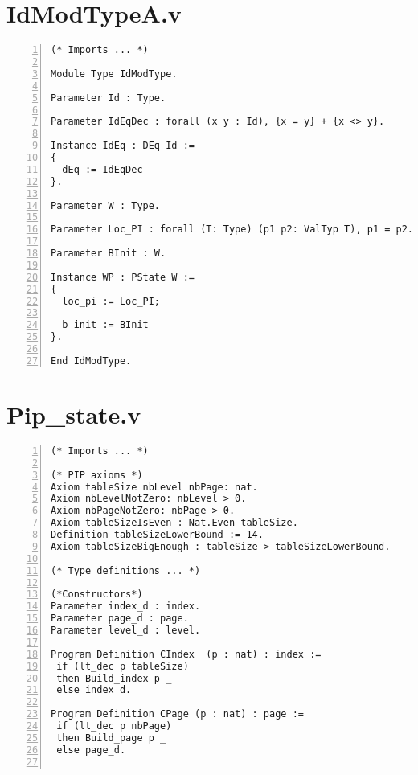 \begin{appendices}

\makeatletter
{}
\makeatother

\chapter{IdModTypeA.v} \label{ModType}
\begin{lstlisting}[xleftmargin=-.1\textwidth,
xrightmargin=-.1\textwidth,
mathescape=true,numbers=left]
(* Imports ... *)

Module Type IdModType.

Parameter Id : Type.

Parameter IdEqDec : forall (x y : Id), {x = y} + {x <> y}.

Instance IdEq : DEq Id :=
{
  dEq := IdEqDec
}.

Parameter W : Type.

Parameter Loc_PI : forall (T: Type) (p1 p2: ValTyp T), p1 = p2.

Parameter BInit : W.

Instance WP : PState W :=
{
  loc_pi := Loc_PI;
  
  b_init := BInit
}.              
  
End IdModType.
\end{lstlisting}

\chapter{Pip\_state.v} \label{stateFile}
\begin{lstlisting}[xleftmargin=-.1\textwidth,
xrightmargin=-.1\textwidth,
mathescape=true,numbers=left]
(* Imports ... *)

(* PIP axioms *)
Axiom tableSize nbLevel nbPage: nat.
Axiom nbLevelNotZero: nbLevel > 0.
Axiom nbPageNotZero: nbPage > 0.
Axiom tableSizeIsEven : Nat.Even tableSize.
Definition tableSizeLowerBound := 14.  
Axiom tableSizeBigEnough : tableSize > tableSizeLowerBound. 

(* Type definitions ... *)

(*Constructors*)
Parameter index_d : index.
Parameter page_d : page.
Parameter level_d : level.

Program Definition CIndex  (p : nat) : index := 
 if (lt_dec p tableSize) 
 then Build_index p _ 
 else index_d.

Program Definition CPage (p : nat) : page := 
 if (lt_dec p nbPage) 
 then Build_page p _ 
 else page_d.


\end{lstlisting}
\end{appendices}
